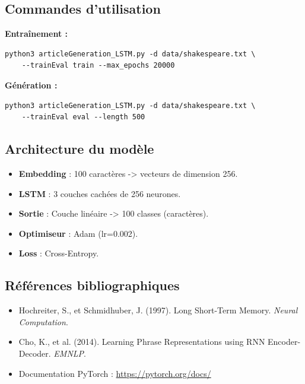 \documentclass[a4paper]{article}
\begin{document}
\subsection{Commandes d'utilisation}
\textbf{Entraînement :}
\begin{lstlisting}
python3 articleGeneration_LSTM.py -d data/shakespeare.txt \
    --trainEval train --max_epochs 20000
\end{lstlisting}

\textbf{Génération :}
\begin{lstlisting}
python3 articleGeneration_LSTM.py -d data/shakespeare.txt \
    --trainEval eval --length 500
\end{lstlisting}

\subsection{Architecture du modèle}
\begin{itemize}
    \item \textbf{Embedding} : 100 caractères -> vecteurs de dimension 256.
    \item \textbf{LSTM} : 3 couches cachées de 256 neurones.
    \item \textbf{Sortie} : Couche linéaire -> 100 classes (caractères).
    \item \textbf{Optimiseur} : Adam (lr=0.002).
    \item \textbf{Loss} : Cross-Entropy.
\end{itemize}

\subsection{Références bibliographiques}
\begin{itemize}
    \item Hochreiter, S., et Schmidhuber, J. (1997). Long Short-Term Memory. \textit{Neural Computation}.
    \item Cho, K., et al. (2014). Learning Phrase Representations using RNN Encoder-Decoder. \textit{EMNLP}.
    \item Documentation PyTorch : \href{https://pytorch.org/docs/}{https://pytorch.org/docs/}
\end{itemize}
\end{document}
